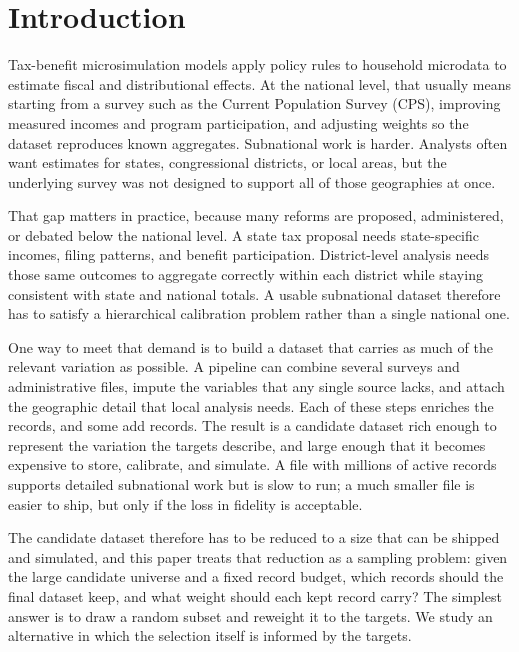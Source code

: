 \section{Introduction}
\label{sec:introduction}

Tax-benefit microsimulation models apply policy rules to household microdata to estimate fiscal and
distributional effects. At the national level, that usually means starting from a survey such as the
Current Population Survey (CPS), improving measured incomes and program participation, and adjusting
weights so the dataset reproduces known aggregates. Subnational work is harder. Analysts often want
estimates for states, congressional districts, or local areas, but the underlying survey was not
designed to support all of those geographies at once.

That gap matters in practice, because many reforms are proposed, administered, or debated below the
national level. A state tax proposal needs state-specific incomes, filing patterns, and benefit
participation. District-level analysis needs those same outcomes to aggregate correctly within each
district while staying consistent with state and national totals. A usable subnational dataset
therefore has to satisfy a hierarchical calibration problem rather than a single national one.

One way to meet that demand is to build a dataset that carries as much of the relevant variation as
possible. A pipeline can combine several surveys and administrative files, impute the variables that
any single source lacks, and attach the geographic detail that local analysis needs. Each of these
steps enriches the records, and some add records. The result is a candidate dataset rich enough to
represent the variation the targets describe, and large enough that it becomes expensive to store,
calibrate, and simulate. A file with millions of active records supports
detailed subnational work but is slow to run; a much smaller file is easier to ship, but only if the
loss in fidelity is acceptable.

The candidate dataset therefore has to be reduced to a size that can be shipped and simulated, and
this paper treats that reduction as a sampling problem: given the large candidate universe and a
fixed record budget, which records should the final dataset keep, and what weight should each kept
record carry? The simplest answer is to draw a random subset
and reweight it to the targets. We study an alternative in which the selection itself is informed by
the targets.

